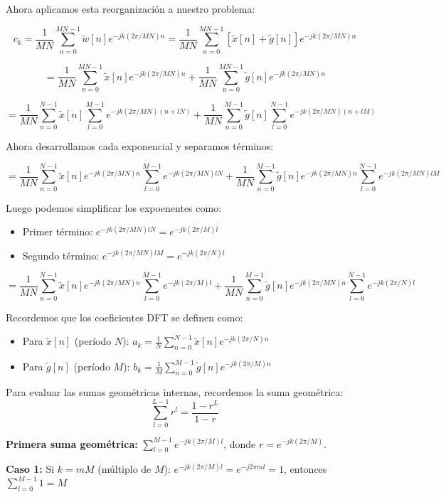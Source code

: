 \documentclass[
  11pt,
  letterpaper,
   addpoints,
   answers
  ]{exam}
\begin{document}
\begin{questions}
\begin{solution}
Ahora aplicamos esta reorganización a nuestro problema:

$$c_k = \frac{1}{MN} \sum_{n=0}^{MN-1} \tilde{w}[n]e^{-jk(2\pi/MN)n} = \frac{1}{MN} \sum_{n=0}^{MN-1} [\tilde{x}[n] + \tilde{g}[n]]e^{-jk(2\pi/MN)n}$$

$$= \frac{1}{MN} \sum_{n=0}^{MN-1} \tilde{x}[n]e^{-jk(2\pi/MN)n} + \frac{1}{MN} \sum_{n=0}^{MN-1} \tilde{g}[n]e^{-jk(2\pi/MN)n}$$

$$= \frac{1}{MN} \sum_{n=0}^{N-1} \tilde{x}[n] \sum_{l=0}^{M-1} e^{-jk(2\pi/MN)(n+lN)} + \frac{1}{MN} \sum_{n=0}^{M-1} \tilde{g}[n] \sum_{l=0}^{N-1} e^{-jk(2\pi/MN)(n+lM)}$$

Ahora desarrollamos cada exponencial y separamos términos:

$$= \frac{1}{MN} \sum_{n=0}^{N-1} \tilde{x}[n] e^{-jk(2\pi/MN)n} \sum_{l=0}^{M-1} e^{-jk(2\pi/MN)lN} + \frac{1}{MN} \sum_{n=0}^{M-1} \tilde{g}[n] e^{-jk(2\pi/MN)n} \sum_{l=0}^{N-1} e^{-jk(2\pi/MN)lM}$$

Luego podemos simplificar los expoenentes como: 
\begin{itemize}
  \item Primer término: $e^{-jk(2\pi/MN)lN} = e^{-jk(2\pi/M)l}$
  \item Segundo término: $e^{-jk(2\pi/MN)lM} = e^{-jk(2\pi/N)l}$
\end{itemize}

$$= \frac{1}{MN} \sum_{n=0}^{N-1} \tilde{x}[n] e^{-jk(2\pi/MN)n} \sum_{l=0}^{M-1} e^{-jk(2\pi/M)l} + \frac{1}{MN} \sum_{n=0}^{M-1} \tilde{g}[n] e^{-jk(2\pi/MN)n} \sum_{l=0}^{N-1} e^{-jk(2\pi/N)l}$$

Recordemos que los coeficientes DFT se definen como:
\begin{itemize}
\item Para $\tilde{x}[n]$ (período $N$): $a_k = \frac{1}{N}\sum_{n=0}^{N-1} \tilde{x}[n]e^{-jk(2\pi/N)n}$
\item Para $\tilde{g}[n]$ (período $M$): $b_k = \frac{1}{M}\sum_{n=0}^{M-1} \tilde{g}[n]e^{-jk(2\pi/M)n}$
\end{itemize}

Para evaluar las sumas geométricas internas, recordemos la suma geométrica:
$$\sum_{l=0}^{L-1} r^l = \frac{1-r^L}{1-r}$$

\textbf{Primera suma geométrica:} $\sum_{l=0}^{M-1} e^{-jk(2\pi/M)l}$, donde $r = e^{-jk(2\pi/M)}$.

\textbf{Caso 1:} Si $k = mM$ (múltiplo de $M$): $e^{-jk(2\pi/M)l} = e^{-j2\pi ml} = 1$, entonces $\sum_{l=0}^{M-1} 1 = M$


\end{solution}
\end{questions}
\end{document}
